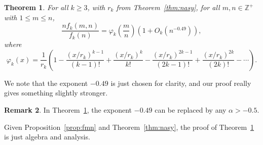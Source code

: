\documentclass{amsart}
\newtheorem{theorem}{Theorem}[section]
\theoremstyle{definition}
\newtheorem{remark}[theorem]{Remark}
\begin{document}
\begin{theorem}\label{thm:fmnasy}
For all $k\geq 3$, with $r_k$ from Theorem~\ref{thm:nasy}, for all $m,n\in \mathbb{Z}^+$ with $1\leq m\leq n$,
\[\frac{nf_k(m,n)}{f_k(n)}=\varphi_k\left(\frac{m}{n}\right)\left(1+O_k\left(n^{-0.49}\right)\right),\]
where 
\[\varphi_k\left(x\right)=\frac{1}{r_k}\left(1-\frac{(x/r_k)^{k-1}}{(k-1)!}+\frac{(x/r_k)^k}{k!}-\frac{(x/r_k)^{2k-1}}{(2k-1)!}+\frac{(x/r_k)^{2k}}{(2k)!}-\cdots \right).\]
\end{theorem}

We note that the exponent $-0.49$ is just chosen for clarity, and our proof really gives something slightly stronger.
\begin{remark}
In Theorem~\ref{thm:fmnasy}, the exponent $-0.49$ can be replaced by any $\alpha>-0.5$.
\end{remark}

Given Proposition~\ref{prop:fmn} and Theorem~\ref{thm:nasy}, the proof of Theorem~\ref{thm:fmnasy} is just algebra and analysis. 
\end{document}
